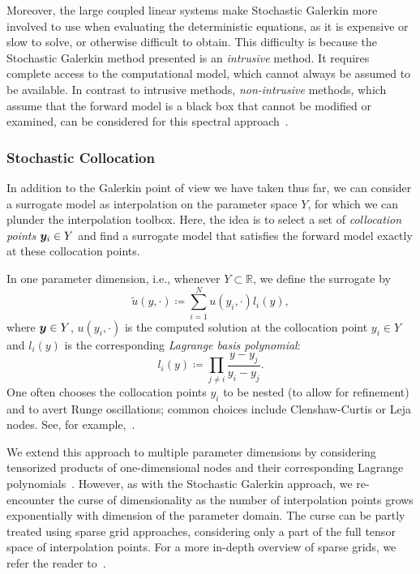 Moreover, the large coupled linear systems make Stochastic Galerkin more involved to use when evaluating the deterministic equations, as it is expensive or slow to solve, or otherwise difficult to obtain.
This difficulty is because the Stochastic Galerkin method presented is an \emph{intrusive} method.
It requires complete access to the computational model, which cannot always be assumed to be available.
In contrast to intrusive methods, \emph{non-intrusive} methods, which assume that the forward model is a black box that cannot be modified or examined, can be considered for this spectral approach~\cite[Chapter~13]{sullivan2015}.

\subsubsection{Stochastic Collocation}
In addition to the Galerkin point of view we have taken thus far, we can consider a surrogate model as interpolation on the parameter space $Y$, for which we can plunder the interpolation toolbox.
Here, the idea is to select a set of \emph{collocation points} ${\bm{y}}_i\in Y$ and find a surrogate model that satisfies the forward model exactly at these collocation points.

In one parameter dimension, i.e., whenever $Y\subset\mathbb{R}$, we define the surrogate by
\begin{equation}
    \tilde{u}(y,\cdot) \coloneqq \sum_{i=1}^N u(y_i, \cdot) l_i(y)\label{eq:lagrageinterp},
\end{equation}
where ${\bm{y}}\in Y$, $u(y_i, \cdot)$ is the computed solution at the collocation point $y_i\in Y$ and $l_i(y)$ is the corresponding \emph{Lagrange basis polynomial}:
\begin{equation*}
    l_i(y)\coloneqq\prod_{j\neq i}\frac{y-y_j}{y_i-y_j}.
\end{equation*}
One often chooses the collocation points $y_i$ to be nested (to allow for refinement) and to avert Runge oscillations; common choices include Clenshaw-Curtis or Leja nodes.
See, for example,~\cite{trefethen2019}.

We extend this approach to multiple parameter dimensions by considering tensorized products of one-dimensional nodes and their corresponding Lagrange polynomials~\cite{xiu2015}.
However, as with the Stochastic Galerkin approach, we re-encounter the curse of dimensionality as the number of interpolation points grows exponentially with dimension of the parameter domain.
The curse can be partly treated using sparse grid approaches, considering only a part of the full tensor space of interpolation points.
For a more in-depth overview of sparse grids, we refer the reader to~\cite{bungartz2004}.


